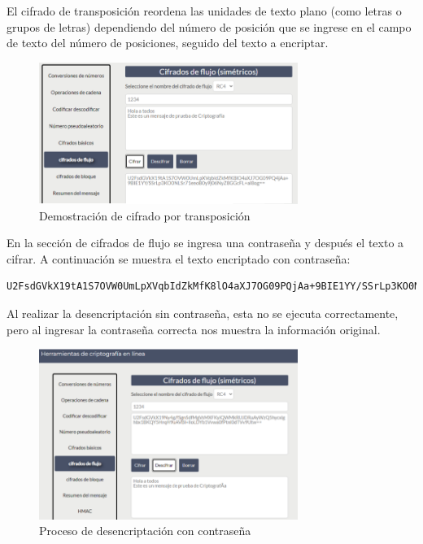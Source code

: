 El cifrado de transposición reordena las unidades de texto plano (como letras o grupos de letras) dependiendo del número de posición que se ingrese en el campo de texto del número de posiciones, seguido del texto a encriptar.

\begin{figure}[H]
	\centering
	\includegraphics[width=0.75\textwidth]{./assets/img3.png}
	\caption{Demostración de cifrado por transposición}
	\label{fig:transposition-cipher}
\end{figure}

\FloatBarrier

En la sección de cifrados de flujo se ingresa una contraseña y después el texto a cifrar. A continuación se muestra el texto encriptado con contraseña:

\begin{lstlisting}[caption={Salida Hash}, label=lst:flow-cipher]
U2FsdGVkX19tA1S7OVW0UmLpXVqbIdZkMfK8lO4aXJ7OG09PQjAa+9BIE1YY/SSrLp3KO0NLSr71eeoB0y9j06NyZ8GGcFL+al8og==
\end{lstlisting}

Al realizar la desencriptación sin contraseña, esta no se ejecuta correctamente, pero al ingresar la contraseña correcta nos muestra la información original.

\begin{figure}[H]
	\centering
	\includegraphics[width=0.75\textwidth]{./assets/img4.png}
	\caption{Proceso de desencriptación con contraseña}
	\label{fig:decryption-process}
\end{figure}

